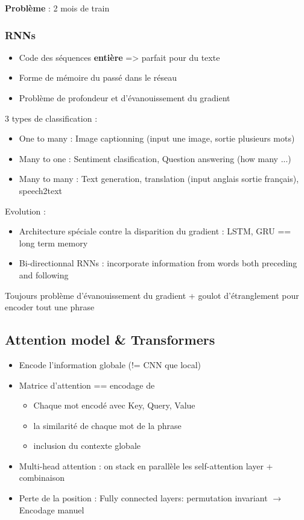 \documentclass{article}
\theoremstyle{plain}%
\theoremstyle{definition}
\theoremstyle{remark}
\begin{document}
\textbf{Problème} : 2 mois de train 

\subsubsection{RNNs}
\begin{itemize}
    \item Code des séquences \textbf{entière} => parfait pour du texte
    \item Forme de mémoire du passé dans le réseau
    \item Problème de profondeur et d'évanouissement du gradient
\end{itemize}
3 types de classification :
\begin{itemize}
    \item One to many : Image captionning (input une image, sortie plusieurs mots)
    \item Many to one : Sentiment clasification, Question answering (how many ...)
    \item Many to many : Text generation, translation (input anglais sortie français), speech2text 
\end{itemize}
Evolution : 
\begin{itemize}
    \item Architecture spéciale contre la disparition du gradient : LSTM, GRU == long term memory 
    \item Bi-directionnal RNNs : incorporate information from words both preceding and following
\end{itemize}
Toujours problème d'évanouissement du gradient + goulot d'étranglement pour encoder tout une phrase

\subsection{Attention model \& Transformers }
\begin{itemize}
    \item Encode l'information globale (!= CNN que local)
    \item Matrice d'attention == encodage de \begin{itemize}
        \item Chaque mot encodé avec Key, Query, Value
        \item la similarité de chaque mot de la phrase
        \item inclusion du contexte globale
    \end{itemize} 
    \item Multi-head attention : on stack en parallèle les self-attention layer + combinaison
    \item Perte de la position : Fully connected layers: permutation invariant $\rightarrow$ Encodage manuel 
\end{itemize}
\end{document}
